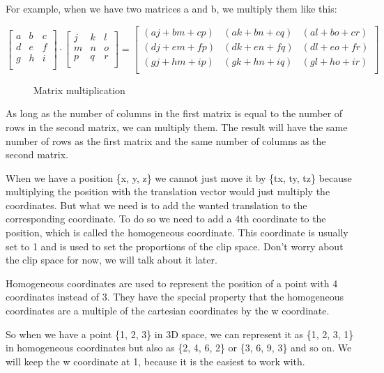 \documentclass[12pt]{report} \usepackage{preamble}
\begin{document}
For example, when we have two matrices a and b, we multiply them like this:

\[
	\begin{bmatrix}
		a & b & c \\
		d & e & f \\
		g & h & i \\
	\end{bmatrix}
	\cdot
	\begin{bmatrix}
		j & k & l \\
		m & n & o \\
		p & q & r \\
	\end{bmatrix}
	=
	\begin{bmatrix}
		(aj + bm + cp) & (ak + bn + cq) & (al + bo + cr) \\
		(dj + em + fp) & (dk + en + fq) & (dl + eo + fr) \\
		(gj + hm + ip) & (gk + hn + iq) & (gl + ho + ir) \\
	\end{bmatrix}
\]

\begin{figure}[hbtp]
	\centering 
	\caption{Matrix multiplication \cite{fig:matrix-multiplication}}
\end{figure}
\Floatbarrier

As long as the number of columns in the first matrix is equal to the number
of rows in the second matrix, we can multiply them. The result will have
the same number of rows as the first matrix and the same number of columns
as the second matrix.

When we have a position \{x, y, z\} we cannot just move it by \{tx, ty, tz\}
because multiplying the position with the translation vector would just
multiply the coordinates. But what we need is to add the wanted translation
to the corresponding coordinate.
To do so we need to add a 4th coordinate to the position, which is called
the homogeneous coordinate. This coordinate is usually set to 1 and is used
to set the proportions of the clip space. Don't worry about the clip space
for now, we will talk about it later.

Homogeneous coordinates are used to represent the position of a point with 4
coordinates instead of 3. They have the special property that the homogeneous
coordinates are a multiple of the cartesian coordinates by the w coordinate.

So when we have a point \{1, 2, 3\} in 3D space, we can represent it as
\{1, 2, 3, 1\} in homogeneous coordinates but also as \{2, 4, 6, 2\} or
\{3, 6, 9, 3\} and so on. We will keep the w coordinate at 1, because it is
the easiest to work with.
\end{document}
